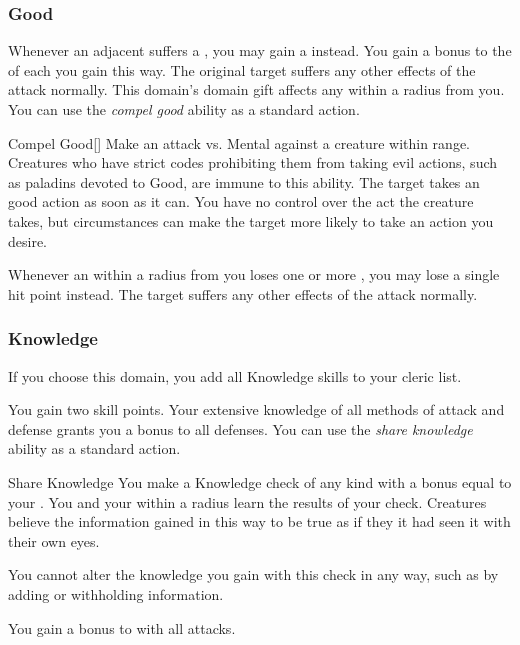         \subsubsection{Good}
             Whenever an adjacent  suffers a , you may gain a  instead.
            You gain a  bonus to the  of each  you gain this way.
            The original target suffers any other effects of the attack normally.
             This domain's domain gift affects any  within a \areamed radius  from you.
             You can use the \textit{compel good} ability as a standard action.
            \begin{freeability}{Compel Good}[]
                Make an attack vs. Mental against a creature within \rngmed range.
                Creatures who have strict codes prohibiting them from taking evil actions, such as paladins devoted to Good, are immune to this ability.
                \hit The target takes an good action as soon as it can.
                You have no control over the act the creature takes, but circumstances can make the target more likely to take an action you desire.
            \end{freeability}
             Whenever an  within a \areamed radius  from you loses one or more , you may lose a single hit point instead.
            The target suffers any other effects of the attack normally.

        \subsubsection{Knowledge}
            If you choose this domain, you add all Knowledge skills to your cleric  list.

             You gain two skill points.
             Your extensive knowledge of all methods of attack and defense grants you a  bonus to all defenses.
             You can use the \textit{share knowledge} ability as a standard action.
            \begin{freeability}{Share Knowledge}
                You make a Knowledge check of any kind with a bonus equal to your .
                You and your  within a \arealarge radius learn the results of your check.
                Creatures believe the information gained in this way to be true as if they it had seen it with their own eyes.

                You cannot alter the knowledge you gain with this check in any way, such as by adding or withholding information.
            \end{freeability}
             You gain a  bonus to  with all attacks.

